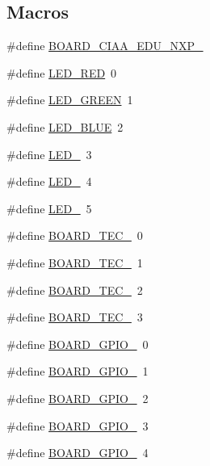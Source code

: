 \subsection*{Macros}
\begin{DoxyCompactItemize}
\item 
\#define \hyperlink{group__hal_ga6f515d6e3593a320103673302982cde0}{B\+O\+A\+R\+D\+\_\+\+C\+I\+A\+A\+\_\+\+E\+D\+U\+\_\+\+N\+X\+P\+\_}
\item 
\#define \hyperlink{group__hal_ga31e20330f8ce94e0dd10b005a15c5898}{L\+E\+D\+\_\+\+R\+ED}~0
\item 
\#define \hyperlink{group__hal_gaca338dbd19d7940923334629f6e5f3b7}{L\+E\+D\+\_\+\+G\+R\+E\+EN}~1
\item 
\#define \hyperlink{group__hal_gae2e40566d27689f8581d7b0f12271d45}{L\+E\+D\+\_\+\+B\+L\+UE}~2
\item 
\#define \hyperlink{group__hal_gaaf81f5fa7d1e779f83e9bf4ce631a7b6}{L\+E\+D\+\_}~3
\item 
\#define \hyperlink{group__hal_gae60a8c1e03b38463f77d556a4a0a8a3b}{L\+E\+D\+\_}~4
\item 
\#define \hyperlink{group__hal_ga07b3fb51ae7c3cc824dd714b46c1b2b6}{L\+E\+D\+\_}~5
\item 
\#define \hyperlink{group__hal_ga92373c8e6c1167c7124e0a314a4250a8}{B\+O\+A\+R\+D\+\_\+\+T\+E\+C\+\_}~0
\item 
\#define \hyperlink{group__hal_gabf1d0431d3373cbd629fb3d0b9db3859}{B\+O\+A\+R\+D\+\_\+\+T\+E\+C\+\_}~1
\item 
\#define \hyperlink{group__hal_ga63f25b055bc23d46b810b2d4d9b0a0a7}{B\+O\+A\+R\+D\+\_\+\+T\+E\+C\+\_}~2
\item 
\#define \hyperlink{group__hal_ga675dc8974b57a5a12d2b1d3df029468f}{B\+O\+A\+R\+D\+\_\+\+T\+E\+C\+\_}~3
\item 
\#define \hyperlink{group__hal_gaf94367bd0fac186967e17f1c374ab6d9}{B\+O\+A\+R\+D\+\_\+\+G\+P\+I\+O\+\_}~0
\item 
\#define \hyperlink{group__hal_gae683ff8737563bf6e785d0094801c813}{B\+O\+A\+R\+D\+\_\+\+G\+P\+I\+O\+\_}~1
\item 
\#define \hyperlink{group__hal_ga9995c0987882803f480795fcc7378624}{B\+O\+A\+R\+D\+\_\+\+G\+P\+I\+O\+\_}~2
\item 
\#define \hyperlink{group__hal_gabe1edb618549af6a3017541a38b0a379}{B\+O\+A\+R\+D\+\_\+\+G\+P\+I\+O\+\_}~3
\item 
\#define \hyperlink{group__hal_ga2237827fe1cc74f48bb6d467c7d1ec1f}{B\+O\+A\+R\+D\+\_\+\+G\+P\+I\+O\+\_}~4

\end{DoxyCompactItemize}

